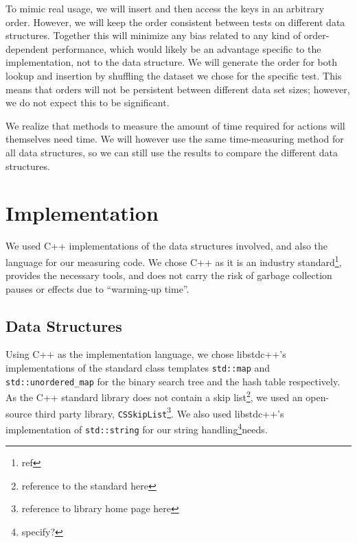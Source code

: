 \documentclass[12pt,a4paper]{article}
\begin{document}
    To mimic real usage, we will insert and then access the keys in an arbitrary order.  However, we will keep the order consistent
    between tests on different data structures.  Together this will minimize any bias related to any kind of order-dependent
    performance, which would likely be an advantage specific to the implementation, not to the data structure. We will
    generate the order for both lookup and insertion by shuffling the dataset we chose for the specific test. This means that
    orders will not be persistent between different data set sizes; however, we do not expect this to be significant.

    We realize that methods to measure the amount of time required for actions will themselves need time. We will however
    use the same time-measuring method for all data structures, so we can still use the results to compare the different
    data structures.

    \section{Implementation}
    \label{sec:implementation}

    We used C++ implementations of the data structures involved, and also the language for our
    measuring code.  We chose C++ as it is an industry standard\footnote{ref}, provides the
    necessary tools, and does not carry the risk of garbage collection pauses or effects due to
    ``warming-up time''.

    \subsection*{Data Structures}

    Using C++ as the implementation language, we chose libstdc++'s implementations of the standard class
    templates \texttt{std::map} and \texttt{std::unordered\_map} for the binary search
    tree and the hash table respectively.  As the C++ standard library does not contain a skip
    list\footnote{reference to the standard here}, we used an open-source third party library,
    \texttt{CSSkipList}\footnote{reference to library home page here}.  We also used libstdc++'s
    implementation of \texttt{std::string} for our string handling\footnote{specify?}needs.
\end{document}

